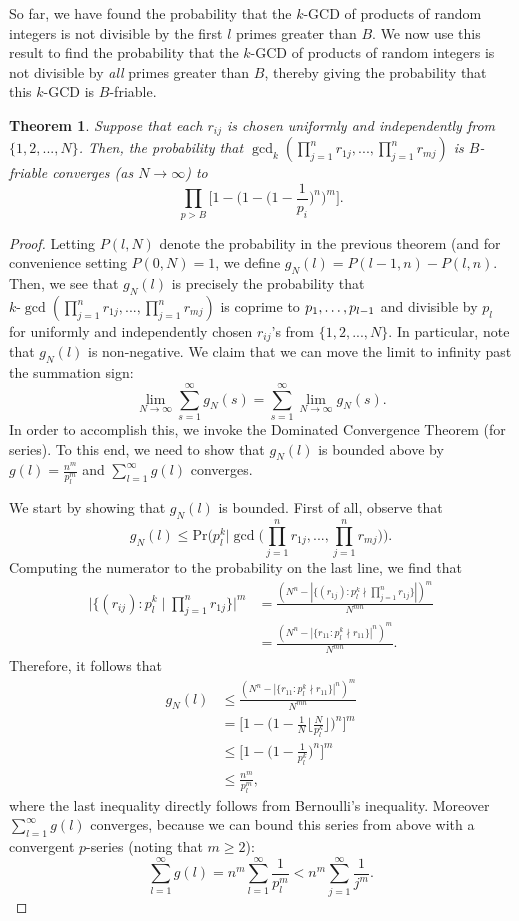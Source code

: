 \documentclass[12pt]{amsart}
\newtheorem{theorem}{Theorem}[subsection]
\theoremstyle{definition}
\begin{document}
So far, we have found the probability that the $k$-GCD of products of random integers is not divisible by the first \(l\) primes greater than \(B\). We now use this result to find the probability that the $k$-GCD of products of random integers is not divisible by \textit{all} primes greater than $B$, thereby giving the probability that this $k$-GCD is $B$-friable.

\begin{theorem} Suppose that each $r_{ij}$ is chosen uniformly and independently from $\{1, 2, ..., N\}$. Then, the probability that $\gcd_k(\prod_{j=1}^n r_{1j}, ... , \prod_{j=1}^n r_{mj})$ is $B$-friable converges (as $N \to \infty$) to
	$$\prod_{p>B} \Big[1 - \Big(1 - \Big(1-\frac{1}{p_i}\Big)^n\Big)^m\Big].$$
\end{theorem}

\begin{proof}
	Letting $P(l, N)$ denote the probability in the previous theorem (and for convenience setting $P(0, N) = 1$, we define $g_N(l) = P(l-1, n) - P(l, n)$. Then, we see that $g_N(l)$ is precisely the probability that $k\text{-}\gcd(\prod_{j=1}^n r_{1j}, ... , \prod_{j=1}^n r_{mj})$ is coprime to $p_1, \mathellipsis, p_{l-1}$ and divisible by $p_l$ for uniformly and independently chosen $r_{ij}$'s from $\{1, 2, ..., N\}$. In particular, note that $g_N(l)$ is non-negative. We claim that we can move the limit to infinity past the summation sign:
	$$\lim_{N \to \infty} \sum_{s=1}^{\infty} g_N(s) = \sum_{s=1}^{\infty} \lim_{N \to \infty} g_N(s).$$
	In order to accomplish this, we invoke the Dominated Convergence Theorem (for series). To this end, we need to show that $g_N(l)$ is bounded above by $g(l) = \frac{n^m}{p_{l}^{m}}$ and $\sum_{l=1}^{\infty} g(l)$ converges.
	
	We start by showing that $g_N(l)$ is bounded. First of all, observe that
	$$g_N(l) \leq \text{Pr}\Big(p_l^k \Big| \gcd\Big(\prod_{j=1}^n r_{1j}, ... , \prod_{j=1}^n r_{mj}\Big)\Big).$$
	Computing the numerator to the probability on the last line, we find that
	\begin{align*} 
		\Big|\{(r_{ij}) : p_l^k \mid \prod_{j=1}^n r_{1j}\}\Big|^m &= \frac{(N^n - |\{(r_{1j}) : p_l^k \nmid \prod_{j=1}^n r_{1j}\}|)^m}{N^{mn}}\\
		&= \frac{(N^n - |\{r_{11} : p_l^k \nmid r_{11}\}|^n)^m}{N^{mn}}. \end{align*}
	Therefore, it follows that
	\begin{align*} 
		g_N(l) &\leq \frac{(N^n - |\{r_{11} : p_l^k \nmid r_{11}\}|^n)^m}{N^{mn}}\\
		&= \Big[1 - \Big(1 - \frac{1}{N} \Big\lfloor \frac{N}{p_l^k}\Big\rfloor\Big)^n\Big]^m\\
		&\leq \Big[1 - \Big(1 - \frac{1}{p_l^k}\Big)^n\Big]^m\\
		&\leq \frac{n^m}{p_l^{m}},\end{align*}
	where the last inequality directly follows from Bernoulli's inequality. Moreover $\sum_{l=1}^{\infty} g(l)$ converges, because we can bound this series from above with a convergent $p$-series (noting that $m \geq 2$):
	$$\sum_{l=1}^{\infty} g(l) = n^m \sum_{l=1}^{\infty} \frac{1}{p_l^m} < n^m \sum_{j=1}^{\infty} \frac{1}{j^m}.$$
	

\end{proof}
\end{document}
